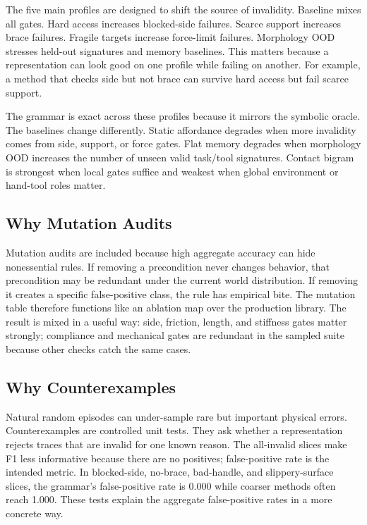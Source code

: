 \documentclass{article}
\begin{document}
The five main profiles are designed to shift the source of invalidity. Baseline mixes all gates. Hard access increases blocked-side failures. Scarce support increases brace failures. Fragile targets increase force-limit failures. Morphology OOD stresses held-out signatures and memory baselines. This matters because a representation can look good on one profile while failing on another. For example, a method that checks side but not brace can survive hard access but fail scarce support.

The grammar is exact across these profiles because it mirrors the symbolic oracle. The baselines change differently. Static affordance degrades when more invalidity comes from side, support, or force gates. Flat memory degrades when morphology OOD increases the number of unseen valid task/tool signatures. Contact bigram is strongest when local gates suffice and weakest when global environment or hand-tool roles matter.

\subsection{Why Mutation Audits}

Mutation audits are included because high aggregate accuracy can hide nonessential rules. If removing a precondition never changes behavior, that precondition may be redundant under the current world distribution. If removing it creates a specific false-positive class, the rule has empirical bite. The mutation table therefore functions like an ablation map over the production library. The result is mixed in a useful way: side, friction, length, and stiffness gates matter strongly; compliance and mechanical gates are redundant in the sampled suite because other checks catch the same cases.

\subsection{Why Counterexamples}

Natural random episodes can under-sample rare but important physical errors. Counterexamples are controlled unit tests. They ask whether a representation rejects traces that are invalid for one known reason. The all-invalid slices make F1 less informative because there are no positives; false-positive rate is the intended metric. In blocked-side, no-brace, bad-handle, and slippery-surface slices, the grammar's false-positive rate is 0.000 while coarser methods often reach 1.000. These tests explain the aggregate false-positive rates in a more concrete way.
\end{document}
